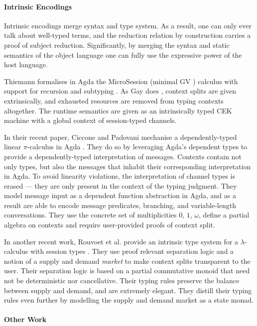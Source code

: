 \documentclass[sigplan,10pt,anonymous,review]{acmart}
\theoremstyle{definition}
\newcommand{\lambdacalc}{$\lambda$-calculus}
\newcommand{\picalc}{$\pi$-calculus}
\begin{document}
\paragraph{Intrinsic Encodings}
 
Intrinsic encodings merge syntax and type system.
As a result, one can only ever talk about well-typed terms, and the reduction relation by construction carries a proof of subject reduction.
Significantly, by merging the syntax and static semantics of the object language one can fully use the expressive power of the host language.

Thiemann formalises in Agda the MicroSession (minimal GV \cite{Gay2010}) calculus with support for recursion and subtyping \cite{Thiemann2019}.
As Gay does \cite{Gay2001}, context splits are given extrinsically, and exhausted resources are removed from typing contexts altogether.
The runtime semantics are given as an intrinsically typed CEK machine with a global context of session-typed channels.

In their recent paper, Ciccone and Padovani mechanise a dependently-typed linear \picalc{} in Agda \cite{Ciccone}.
They do so by leveraging Agda's dependent types to provide a dependently-typed interpretation of messages.
Contexts contain not only types, but also the messages that inhabit their corresponding interpretation in Agda.
To avoid linearity violations, the interpretation of channel types is erased --- they are only present in the context of the typing judgment.
They model message input as a dependent function abstraction in Agda, and as a result are able to encode message predicates, branching, and variable-length conversations.
They use the concrete set of multiplicities $0$, $1$, $\omega$, define a partial algebra on contexts and require user-provided proofs of context split.

In another recent work, Rouvoet et al. provide an intrinsic type system for a \lambdacalc{} with session types \cite{Rouvoet2020}.
They use proof relevant separation logic and a notion of a supply and demand \emph{market} to make context splits transparent to the user.
Their separation logic is based on a partial commutative monoid that need not be deterministic nor cancellative.
Their typing rules preserve the balance between supply and demand, and are extremely elegant.
They distill their typing rules even further by modelling the supply and demand market as a state monad.

\paragraph{Other Work}
\end{document}
